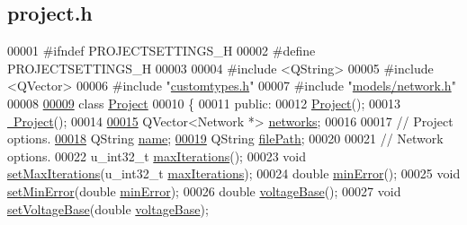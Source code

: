 \hypertarget{project_8h_source}{}\subsection{project.\+h}
\label{project_8h_source}

\begin{DoxyCode}
00001 \textcolor{preprocessor}{#ifndef PROJECTSETTINGS\_H}
00002 \textcolor{preprocessor}{#define PROJECTSETTINGS\_H}
00003 
00004 \textcolor{preprocessor}{#include <QString>}
00005 \textcolor{preprocessor}{#include <QVector>}
00006 \textcolor{preprocessor}{#include "\hyperlink{customtypes_8h}{customtypes.h}"}
00007 \textcolor{preprocessor}{#include "\hyperlink{network_8h}{models/network.h}"}
00008 
\hypertarget{project_8h_source_l00009}{}\hyperlink{class_project}{00009} \textcolor{keyword}{class }\hyperlink{class_project}{Project}
00010 \{
00011 \textcolor{keyword}{public}:
00012   \hyperlink{class_project_aa007ecd17d5bc800e7a956cf666eea21}{Project}();
00013   \hyperlink{class_project_ad165d61b76ee86ee9c27fd987a2a7b9e}{~Project}();
00014 
\hypertarget{project_8h_source_l00015}{}\hyperlink{class_project_a28c99cc1f0568fbc6f2428894acf3c3a}{00015}   QVector<Network *> \hyperlink{class_project_a28c99cc1f0568fbc6f2428894acf3c3a}{networks};
00016 
00017   \textcolor{comment}{// Project options.}
\hypertarget{project_8h_source_l00018}{}\hyperlink{class_project_a82dd2d1bc38f9fd08c9a811fcaa76b38}{00018}   QString \hyperlink{class_project_a82dd2d1bc38f9fd08c9a811fcaa76b38}{name};
\hypertarget{project_8h_source_l00019}{}\hyperlink{class_project_a79f30adcefd0b72bd4ac7db724bc9531}{00019}   QString \hyperlink{class_project_a79f30adcefd0b72bd4ac7db724bc9531}{filePath};
00020 
00021   \textcolor{comment}{// Network options.}
00022   u\_int32\_t \hyperlink{class_project_ad85e1754cbab65e20f269e79c5caa789}{maxIterations}();
00023   \textcolor{keywordtype}{void} \hyperlink{class_project_abac6e194d2d16fbdbe51627844eae60b}{setMaxIterations}(u\_int32\_t \hyperlink{class_project_ad85e1754cbab65e20f269e79c5caa789}{maxIterations});
00024   \textcolor{keywordtype}{double} \hyperlink{class_project_a457ed8d3b0ea5816f928977509f69a34}{minError}();
00025   \textcolor{keywordtype}{void} \hyperlink{class_project_a2cb776c39adb42a1113bf7887d0d4636}{setMinError}(\textcolor{keywordtype}{double} \hyperlink{class_project_a457ed8d3b0ea5816f928977509f69a34}{minError});
00026   \textcolor{keywordtype}{double} \hyperlink{class_project_a4e857ccb6162f57f5d72f4e7199e4573}{voltageBase}();
00027   \textcolor{keywordtype}{void} \hyperlink{class_project_a494c3e89851f754188c7abaedbf77ef6}{setVoltageBase}(\textcolor{keywordtype}{double} \hyperlink{class_project_a4e857ccb6162f57f5d72f4e7199e4573}{voltageBase});

\end{DoxyCode}
